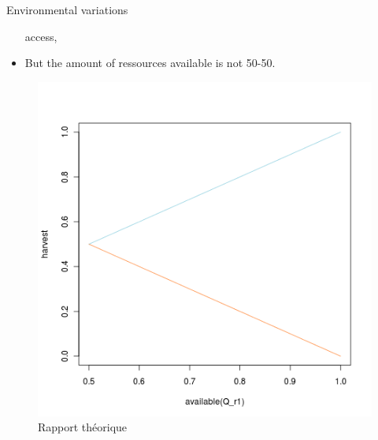 \documentclass[8pt, handout=show,notes=show]{beamer}
\begin{document}
\begin{frame}{}
\begin{block}{Environmental variations}
\begin{itemize}
access, 
		 \item But the amount of ressources available is not 50-50.
		\end{itemize}
	\end{block}
		\begin{figure}
			\caption{Rapport théorique}
			\includegraphics[width=\imgSize]{../images/theoritical}
		\end{figure}

\end{frame}
\end{document}

